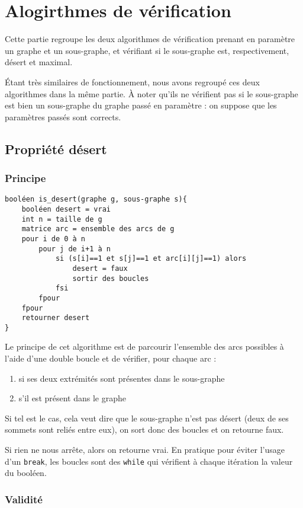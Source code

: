 \section{Alogirthmes de vérification}

Cette partie regroupe les deux algorithmes de vérification prenant en paramètre un graphe et un sous-graphe, et vérifiant si le sous-graphe est, respectivement, désert et maximal. 

Étant très similaires de fonctionnement, nous avons regroupé ces deux algorithmes dans la même partie. À noter qu'ils ne vérifient pas si le sous-graphe est bien un sous-graphe du graphe passé en paramètre : on suppose que les paramètres passés sont corrects.

\subsection{Propriété \og désert \fg}

\subsubsection{Principe}

\begin{verbatim}
booléen is_desert(graphe g, sous-graphe s){
    booléen desert = vrai
    int n = taille de g
    matrice arc = ensemble des arcs de g
    pour i de 0 à n
        pour j de i+1 à n
            si (s[i]==1 et s[j]==1 et arc[i][j]==1) alors 
                desert = faux
                sortir des boucles
            fsi
        fpour
    fpour
    retourner desert
}
\end{verbatim}
Le principe de cet algorithme est de parcourir l'ensemble des arcs possibles à l'aide d'une double boucle et de vérifier, pour chaque arc :
\begin{enumerate}
	\item si ses deux extrémités sont présentes dans le sous-graphe
	\item s'il est présent dans le graphe
\end{enumerate}
Si tel est  le cas, cela veut dire que le sous-graphe n'est pas désert (deux de ses sommets sont reliés entre eux), on sort donc des boucles et on retourne faux.

Si rien ne nous arrête, alors on retourne vrai. En pratique pour éviter l'usage d'un \verb|break|, les boucles sont des \verb|while| qui vérifient à chaque itération la valeur du booléen.

\subsubsection{Validité}


